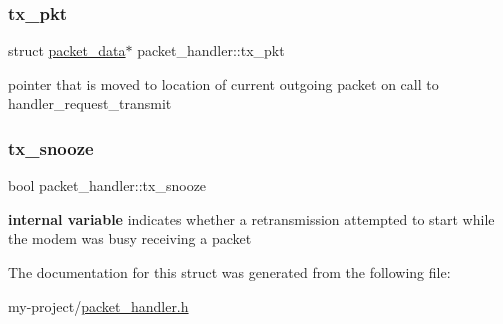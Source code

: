 \subsubsection{\texorpdfstring{tx\+\_\+pkt}{tx\_pkt}}
{\footnotesize\ttfamily struct \mbox{\hyperlink{structpacket__data}{packet\+\_\+data}}$\ast$ packet\+\_\+handler\+::tx\+\_\+pkt}

pointer that is moved to location of current outgoing packet on call to handler\+\_\+request\+\_\+transmit \mbox{\label{structpacket__handler_ab717deca06abb0b04f696c14a7231312}} 
\subsubsection{\texorpdfstring{tx\+\_\+snooze}{tx\_snooze}}
{\footnotesize\ttfamily bool packet\+\_\+handler\+::tx\+\_\+snooze}

{\bfseries internal variable} indicates whether a retransmission attempted to start while the modem was busy receiving a packet 

The documentation for this struct was generated from the following file\+:\begin{DoxyCompactItemize}
\item 
my-\/project/\mbox{\hyperlink{packet__handler_8h}{packet\+\_\+handler.\+h}}\end{DoxyCompactItemize}
